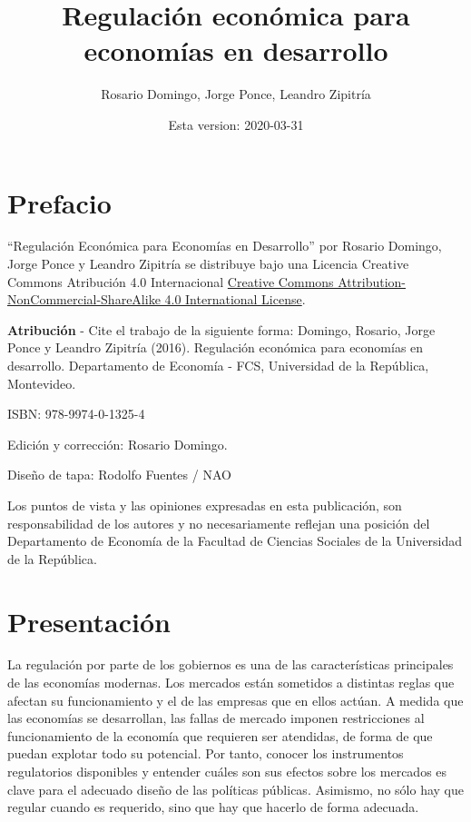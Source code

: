 \documentclass[
  12pt,
  spanish,
]{book}
\title{Regulación económica para economías en desarrollo}
\author{Rosario Domingo, Jorge Ponce, Leandro Zipitría}
\date{Esta version: 2020-03-31}
\begin{document}
\frontmatter
\maketitle

\mainmatter
\hypertarget{prefacio}{%
\chapter*{Prefacio}\label{prefacio}}

``Regulación Económica para Economías en Desarrollo'' por Rosario
Domingo, Jorge Ponce y Leandro Zipitría se distribuye bajo una Licencia
Creative Commons Atribución 4.0 Internacional
\href{http://creativecommons.org/licenses/by-nc-sa/4.0/}{Creative
Commons Attribution-NonCommercial-ShareAlike 4.0 International License}.

\textbf{Atribución} - Cite el trabajo de la siguiente forma: Domingo,
Rosario, Jorge Ponce y Leandro Zipitría (2016). Regulación económica
para economías en desarrollo. Departamento de Economía - FCS,
Universidad de la República, Montevideo.

ISBN: 978-9974-0-1325-4

Edición y corrección: Rosario Domingo.

Diseño de tapa: Rodolfo Fuentes / NAO

Los puntos de vista y las opiniones expresadas en esta publicación, son
responsabilidad de los autores y no necesariamente reflejan una posición
del Departamento de Economía de la Facultad de Ciencias Sociales de la
Universidad de la República.

\newpage

\hypertarget{intro}{%
\chapter*{Presentación}\label{intro}}

La regulación por parte de los gobiernos es una de las características
principales de las economías modernas. Los mercados están sometidos a
distintas reglas que afectan su funcionamiento y el de las empresas que
en ellos actúan. A medida que las economías se desarrollan, las fallas
de mercado imponen restricciones al funcionamiento de la economía que
requieren ser atendidas, de forma de que puedan explotar todo su
potencial. Por tanto, conocer los instrumentos regulatorios disponibles
y entender cuáles son sus efectos sobre los mercados es clave para el
adecuado diseño de las políticas públicas. Asimismo, no sólo hay que
regular cuando es requerido, sino que hay que hacerlo de forma adecuada.
\end{document}
